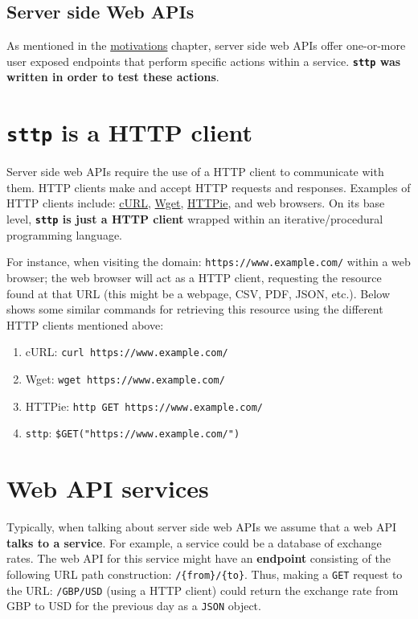 \documentclass[]{full}
\theoremstyle{definition}
\begin{document}
\subsection{Server side Web APIs}

As mentioned in the \hyperref[chap:motivations]{motivations} chapter, server side web APIs offer one-or-more user exposed endpoints that perform specific actions within a service. \cprotect\textbf{\verb|sttp| was written in order to test these actions}.

\cprotect\section{\verb|sttp| is a HTTP client}
\label{sec:meet-sttp-http-clients}

Server side web APIs require the use of a HTTP client to communicate with them. HTTP clients make and accept HTTP requests and responses. Examples of HTTP clients include: \href{https://github.com/curl/curl}{cURL}, \href{https://www.gnu.org/software/wget/}{Wget}, \href{https://httpie.io/}{HTTPie}, and web browsers. On its base level, \cprotect\textbf{\verb|sttp| is just a HTTP client} wrapped within an iterative/procedural programming language.

For instance, when visiting the domain: \verb|https://www.example.com/| within a web browser; the web browser will act as a HTTP client, requesting the resource found at that URL (this might be a webpage, CSV, PDF, JSON, etc.). Below shows some similar commands for retrieving this resource using the different HTTP clients mentioned above:

\begin{enumerate}
    \item cURL: \texttt{curl https://www.example.com/}
    \item Wget: \texttt{wget https://www.example.com/}
    \item HTTPie: \texttt{http GET https://www.example.com/}
    \item \verb|sttp|: \verb|$GET("https://www.example.com/")|
\end{enumerate}

\section{Web API services}

Typically, when talking about server side web APIs we assume that a web API \textbf{talks to a service}. For example, a service could be a database of exchange rates. The web API for this service might have an \textbf{endpoint} consisting of the following URL path construction: \verb|/{from}/{to}|. Thus, making a \verb|GET| request to the URL: \verb|/GBP/USD| (using a HTTP client) could return the exchange rate from GBP to USD for the previous day as a \verb|JSON| object.
\end{document}
